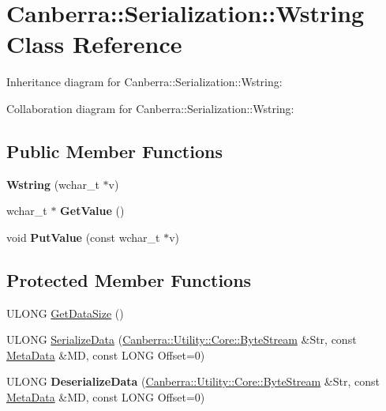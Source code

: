 \hypertarget{class_canberra_1_1_serialization_1_1_wstring}{}\section{Canberra\+:\+:Serialization\+:\+:Wstring Class Reference}
\label{class_canberra_1_1_serialization_1_1_wstring}


Inheritance diagram for Canberra\+:\+:Serialization\+:\+:Wstring\+:


Collaboration diagram for Canberra\+:\+:Serialization\+:\+:Wstring\+:
\subsection*{Public Member Functions}
\begin{DoxyCompactItemize}
\item 
\mbox{\label{class_canberra_1_1_serialization_1_1_wstring_a316e9770d60947666b793efd9e412638}} 
{\bfseries Wstring} (wchar\+\_\+t $\ast$v)
\item 
\mbox{\label{class_canberra_1_1_serialization_1_1_wstring_ae27c028a2c688b74577692b4ff8cacc0}} 
wchar\+\_\+t $\ast$ {\bfseries Get\+Value} ()
\item 
\mbox{\label{class_canberra_1_1_serialization_1_1_wstring_a752067b62b12e9c92b1eda945e9ae871}} 
void {\bfseries Put\+Value} (const wchar\+\_\+t $\ast$v)
\end{DoxyCompactItemize}
\subsection*{Protected Member Functions}
\begin{DoxyCompactItemize}
\item 
U\+L\+O\+NG \hyperlink{class_canberra_1_1_serialization_1_1_wstring_a6265a900bd12dedee77bbe7314423079_a6265a900bd12dedee77bbe7314423079}{Get\+Data\+Size} ()
\item 
U\+L\+O\+NG \hyperlink{class_canberra_1_1_serialization_1_1_wstring_a6d71e900d2e8b02fe198b41b392ec5d2_a6d71e900d2e8b02fe198b41b392ec5d2}{Serialize\+Data} (\hyperlink{class_canberra_1_1_utility_1_1_core_1_1_byte_stream}{Canberra\+::\+Utility\+::\+Core\+::\+Byte\+Stream} \&Str, const \hyperlink{class_canberra_1_1_serialization_1_1_meta_data}{Meta\+Data} \&MD, const L\+O\+NG Offset=0)
\item 
\mbox{\label{class_canberra_1_1_serialization_1_1_wstring_a74243bf95e091afae9ff9c7f041c289f}} 
U\+L\+O\+NG {\bfseries Deserialize\+Data} (\hyperlink{class_canberra_1_1_utility_1_1_core_1_1_byte_stream}{Canberra\+::\+Utility\+::\+Core\+::\+Byte\+Stream} \&Str, const \hyperlink{class_canberra_1_1_serialization_1_1_meta_data}{Meta\+Data} \&MD, const L\+O\+NG Offset=0)
\end{DoxyCompactItemize}
